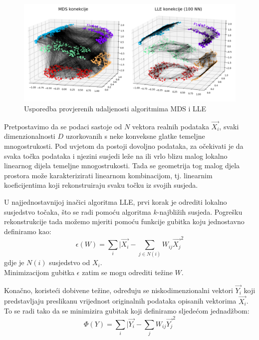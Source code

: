 \documentclass[times, utf8, diplomski]{fer}
\begin{document}
\begin{figure}[htb]
    \centering
    \includegraphics[width=\textwidth]{resources/images/reduction/connections.png}
    \caption{Usporedba provjerenih udaljenosti algoritmima MDS i LLE}
    \label{fig:connections}
\end{figure}

Pretpostavimo da se podaci sastoje od $N$ vektora realnih podataka $\vec{X_i}$, svaki dimenzionalnosti $D$ uzorkovanih s neke konveksne glatke temeljne mnogostrukosti. Pod uvjetom da postoji dovoljno podataka, za očekivati je da svaka točka podataka i njezini susjedi leže na ili vrlo blizu malog lokalno linearnog dijela temeljne mnogostrukosti. Tada se geometrija tog malog djela prostora može karakterizirati linearnom kombinacijom, tj. linearnim koeficijentima koji rekonstruiraju svaku točku iz svojih susjeda.

U najjednostavnijoj inačici algoritma LLE, prvi korak je odrediti lokalno susjedstvo točaka, što se radi pomoću algoritma $k$-najbližih susjeda. Pogrešku rekonstrukcije tada možemo mjeriti pomoću funkcije gubitka koju jednostavno definiramo kao:
\begin{equation}
    \epsilon(W) = \sum_i \vert{\vec{X_i} - \sum_{j \in N(i)} W_{ij} \vec{X_j}}^2
    \label{eq:lle1}
\end{equation}
gdje je $N(i)$ susjedstvo od $X_i$.\\
Minimizacijom gubitka $\epsilon$ zatim se mogu odrediti težine $W$.

Konačno, koristeći dobivene težine, određuju se niskodimenzionalni vektori $\vec{Y_i}$ koji predstavljaju preslikanu vrijednost originalnih podataka opisanih vektorima $\vec{X_i}$. To se radi tako da se minimizira gubitak koji definiramo sljedećom jednadžbom:
\begin{equation}
    \Phi(Y) = \sum_i \vert{\vec{Y_i} - \sum_{j} W_{ij} \vec{Y_j}}^2
    \label{eq:lle2}
\end{equation}
\end{document}
